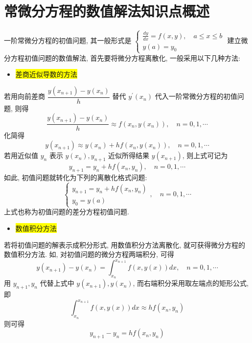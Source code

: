 
\newpage

\section{常微分方程的数值解法知识点概述}

一阶常微分方程的初值问题, 其一般形式是
$
\left\{\begin{array}{l}
\frac{d y}{d x}=f(x, y), \quad a \leqslant x \leqslant b \\
y(a)=y_{0}
\end{array}\right.
$
建立微分方程初值问题的数值解法, 首先要将微分方程离散化, 一般采用以下几种方法:
\begin{itemize}
    \item  \colorbox{yellow}{差商近似导数的方法}
\end{itemize}


若用向前差商 $ \dfrac{y\left(x_{n+1}\right)-y\left(x_{n}\right)}{h} $ 替代 $ y^{\prime}\left(x_{n}\right) $ 代入一阶常微分方程的初值问题, 则得
$$
\frac{y\left(x_{n+1}\right)-y\left(x_{n}\right)}{h} \approx f\left(x_{n}, y\left(x_{n}\right)\right), \quad n=0,1, \cdots
$$
化简得
$$
y\left(x_{n+1}\right) \approx y\left(x_{n}\right)+h f\left(x_{n}, y\left(x_{n}\right)\right), \quad n=0,1, \cdots
$$
若用近似值 $ y_{n} $ 表示 $ y\left(x_{n}\right), y_{n+1} $ 近似所得结果 $ y\left(x_{n+1}\right) $, 则上式可记为
$$
y_{n+1}=y_{n}+h f\left(x_{n}, y_{n}\right), \quad n=0,1, \cdots
$$
如此, 初值问题就转化为下列的离散化格式问题:
$$
\left\{\begin{array}{l}
y_{n+1}=y_{n}+h f\left(x_{n}, y_{n}\right) \\
y_{0}=y(a)
\end{array}, \quad n=0,1, \cdots\right.
$$
上式也称为初值问题的差分方程初值问题.

\begin{itemize}
    \item \colorbox{yellow}{数值积分方法}
\end{itemize}


若将初值问题的解表示成积分形式, 用数值积分方法离散化, 就可获得微分方程的数值积分方法. 如, 对初值问题的微分方程两端积分, 可得
$$
y\left(x_{n+1}\right)-y\left(x_{n}\right)=\int_{x_{n}}^{x_{n+1}} f(x, y(x)) d x, \quad n=0,1, \cdots
$$
用 $ y_{n+1}, y_{n} $ 代替上式中 $ y\left(x_{n+1}\right), y\left(x_{n}\right) $, 而右端积分采用取左端点的矩形公式, 即
$$
\int_{x_{n}}^{x_{n+1}} f(x, y(x)) d x \approx h f\left(x_{n}, y_{n}\right)
$$
则可得
$$
y_{n+1}-y_{n}=h f\left(x_{n}, y_{n}\right)
$$

